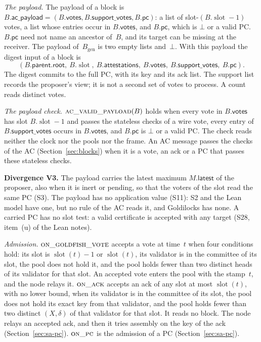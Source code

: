 \documentclass{article}
\newcommand{\genesis}{B_{\mathrm{gen}}}
\newcommand{\slot}{\operatorname{slot}}
\newcommand{\parent}{\mathsf{parent}}
\newcommand{\rootf}{\mathsf{root}}
\newcommand{\acp}{\mathsf{ac\_payload}}
\newcommand{\pc}{\mathsf{pc}}
\newcommand{\PCdiv}[2]{\par\noindent\textbf{Divergence #1.} #2\par}
\begin{document}
\emph{The payload.}  The payload of a block is
$B.\acp=(B.\mathsf{votes},B.\mathsf{support\_votes},B.\pc)$: a list of
slot-$(B.\slot-1)$ votes, a list whose entries occur in
$B.\mathsf{votes}$, and $B.\pc$, which is $\bot$ or a valid PC.  $B.\pc$
need not name an ancestor of~$B$, and its target can be missing at the
receiver.  The payload of~$\genesis$ is two empty lists and~$\bot$.  With
this payload the digest input of a block is
\[
 (B.\parent.\rootf,\ B.\slot,\ B.\mathsf{attestations},\
 B.\mathsf{votes},\ B.\mathsf{support\_votes},\ B.\pc).
\]
The digest commits to the full PC, with its key and its ack list.  The
support list records the proposer's view; it is not a second set of votes
to process.  A count reads distinct votes.

\emph{The payload check.}  $\Call{ac\_valid\_payload}{B}$ holds when every
vote in $B.\mathsf{votes}$ has slot $B.\slot-1$ and passes the stateless
checks of a wire vote, every entry of $B.\mathsf{support\_votes}$ occurs in
$B.\mathsf{votes}$, and $B.\pc$ is $\bot$ or a valid PC.  The check reads
neither the clock nor the pools nor the frame.  An AC message passes the
checks of the AC (Section~\ref{sec:blocks}) when it is a vote, an ack or a
PC that passes these stateless checks.

\PCdiv{V3}{The payload carries the latest maximum $M.\mathsf{latest}$ of
the proposer, also when it is inert or pending, so that the voters of the
slot read the same PC (S3).  The payload has no application value (S11):
S2 and the Lean model have one, but no rule of the AC reads it, and
Goldilocks has none.  A carried PC has no slot test: a valid certificate
is accepted with any target (S28, item~(u) of the Lean notes).}

\emph{Admission.}  $\Call{on\_goldfish\_vote}{}$ accepts a vote at time~$t$
when four conditions hold: its slot is $\slot(t)-1$ or $\slot(t)$, its
validator is in the committee of its slot, the pool does not hold it, and
the pool holds fewer than two distinct heads of its validator for that
slot.  An accepted vote enters the pool with the stamp~$t$, and the node
relays it.  $\Call{on\_ack}{}$ accepts an ack of any slot at most
$\slot(t)$, with no lower bound, when its validator is in the committee of
its slot, the pool does not hold its exact key from that validator, and
the pool holds fewer than two distinct $(X,\delta)$ of that validator for
that slot.  It reads no block.  The node relays an accepted ack, and then
it tries assembly on the key of the ack (Section~\ref{sec:sa-pc}).
$\Call{on\_pc}{}$ is the admission of a PC (Section~\ref{sec:sa-pc}).
\end{document}
